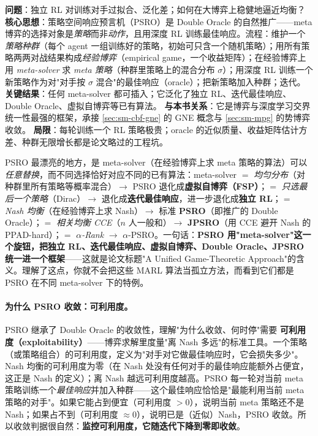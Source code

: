 \begin{paper}\label{paper:psro}
\textbf{问题}：独立 RL 对训练对手过拟合、泛化差；如何在大博弈上稳健地逼近均衡？
\textbf{核心思想}\cite{lanctot2017psro}：策略空间响应预言机（PSRO）是 Double Oracle 的自然推广——meta 博弈的选择对象是\emph{策略}而非\emph{动作}，且用深度 RL 训练最佳响应。流程：维护一个\emph{策略种群}（每个 agent 一组训练好的策略，初始可只含一个随机策略）；用所有策略两两对战结果构成\emph{经验博弈}（empirical game，一个收益矩阵）；在经验博弈上用 \emph{meta-solver} 求 \emph{meta 策略}（种群里策略上的混合分布 $\sigma$）；用深度 RL 训练一个新策略作为对"对手按 $\sigma$ 混合"的最佳响应（oracle）；把新策略加入种群；迭代。
\textbf{关键结果}：任何 meta-solver 都可插入；它泛化了独立 RL、迭代最佳响应、Double Oracle、虚拟自博弈等已有算法。
\textbf{与本书关系}：它是博弈与深度学习交界统一性最强的框架，承接 \cref{sec:sm-cbf-gne} 的 GNE 概念与 \cref{sec:sm-mpg} 的势博弈收敛。
\textbf{局限}：每轮训练一个 RL 策略极贵；oracle 的近似质量、收益矩阵估计方差、种群无限增长都是论文略过的工程坑。
\end{paper}

\begin{insight}[meta-solver 的选择 $=$ 一个旋钮统一所有 MARL]
PSRO 最漂亮的地方，是 meta-solver（在经验博弈上求 meta 策略的算法）可以\emph{任意替换}，而不同选择恰好对应不同的已有算法：meta-solver $=$ \emph{均匀分布}（对种群里所有策略等概率混合）$\to$ PSRO 退化成\textbf{虚拟自博弈（FSP）}；$=$ \emph{只选最后一个策略}（Dirac）$\to$ 退化成\textbf{迭代最佳响应}，进一步退化成\textbf{独立 RL}；$=$ \emph{Nash 均衡}（在经验博弈上求 Nash）$\to$ 标准 \textbf{PSRO}（即推广的 Double Oracle）；$=$ \emph{相关均衡 CCE}（$n$ 人一般和）$\to$ \textbf{JPSRO}\cite{marris2021jpsro}（用 CCE 避开 Nash 的 PPAD-hard）；$=$ \emph{$\alpha$-Rank} $\to$ $\alpha$-PSRO\cite{muller2020alpharank}。一句话：\textbf{PSRO 用"meta-solver"这一个旋钮，把独立 RL、迭代最佳响应、虚拟自博弈、Double Oracle、JPSRO 统一进一个框架}——这就是论文标题"A Unified Game-Theoretic Approach"的含义。理解了这点，你就不会把这些 MARL 算法当孤立方法，而看到它们都是 PSRO 在不同 meta-solver 下的特例。
\end{insight}

\paragraph{为什么 PSRO 收敛：可利用度。}
PSRO 继承了 Double Oracle 的收敛性，理解"为什么收敛、何时停"需要 \textbf{可利用度（exploitability）}——博弈求解里度量"离 Nash 多远"的标准工具。一个策略（或策略组合）的可利用度，定义为"对手对它做最佳响应时，它会损失多少"。Nash 均衡的可利用度为零（在 Nash 处没有任何对手的最佳响应能额外占便宜，这正是 Nash 的定义）；离 Nash 越远可利用度越高。PSRO 每一轮对当前 meta 策略训练一个\emph{最佳响应}并加入种群——这个最佳响应恰恰是"最能利用当前 meta 策略的对手"。如果它能占到便宜（可利用度 $>0$），说明当前 meta 策略还不是 Nash；如果占不到（可利用度 $\approx0$），说明已是（近似）Nash，PSRO 收敛。所以收敛判据很自然：\textbf{监控可利用度，它随迭代下降到零即收敛}。


